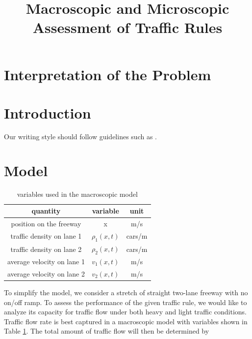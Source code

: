\documentclass[aps,prl,superscriptaddress,12pt]{revtex4-1}
\begin{document}
	\title{Macroscopic and Microscopic Assessment of Traffic Rules }
		
	\begin{abstract}
		
	\end{abstract}
	
\maketitle

	\section{Interpretation of the Problem}

	\section{Introduction}
		Our writing style should follow guidelines such as \cite{science_writing}.

	\section{Model}
	
	\begin{table}
	\begin{tabular}{|c|c|c|} \hline
	quantity & variable & unit \\ \hline
	position on the freeway & x & m/s \\ \hline
	traffic density on lane 1 & $\rho_1(x,t)$ & cars/m \\ \hline
	traffic density on lane 2 & $\rho_2(x,t)$ & cars/m \\ \hline
	average velocity on lane 1 & $v_1(x,t)$ & m/s \\ \hline
	average velocity on lane 2 & $v_2(x,t)$ & m/s \\ \hline
	\end{tabular}
	\caption{ variables used in the macroscopic model \label{tab:variables} }
	\end{table}	
	
	To simplify the model, we consider a stretch of straight two-lane freeway with no on/off ramp. To assess the performance of the given traffic rule, we would like to analyze its capacity for traffic flow under both heavy and light traffic conditions. Traffic flow rate is best captured in a macroscopic model with variables shown in Table \ref{tab:variables}. The total amount of traffic flow will then be determined by 
	
\end{document}
